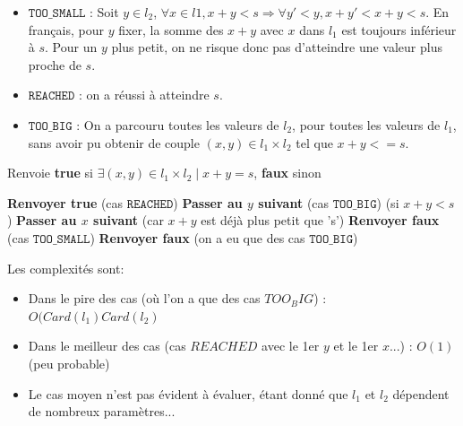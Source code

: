 \documentclass[10pt]{article}
\begin{document}
				\begin{itemize}[label=-]
					\setlength\itemsep{0.1em}
					\item $\mathtt{TOO\_SMALL}$ : Soit $y \in l_2$, $\forall x \in l1, x + y < s \Rightarrow \forall y' < y, x + y' < x + y < s$.
					En français, pour $y$ fixer, la somme des $x + y$ avec $x$ dans $l_1$ est toujours inférieur à $s$.
					Pour un $y$ plus petit, on ne risque donc pas d'atteindre une valeur plus proche de $s$.
					\item $\mathtt{REACHED}$ : on a réussi à atteindre $s$.
					\item $\mathtt{TOO\_BIG}$ : On a parcouru toutes les valeurs de $l_2$, pour toutes les valeurs de $l_1$,
					sans avoir pu obtenir de couple $(x, y) \in l_1 \times l_2$ tel que $x + y <= s$.
				\end{itemize}
				
				\begin{algorithm}
					\caption{Renvoie \textbf{true} si $\exists (x, y) \in l_1 \times l_2 \mid x + y = s$, \textbf{faux} sinon}
					\begin{algorithmic}[1]
										\State \textbf{Renvoyer true} (cas $\mathtt{REACHED}$)
										\State \textbf{Passer au $y$ suivant} (cas $\mathtt{TOO\_BIG}$)
									\Else (si $x + y < s$)
										\State \textbf{Passer au $x$ suivant} (car $x + y$ est déjà plus petit que 's')
									\EndIf
								\EndFor
								\State \textbf{Renvoyer faux} (cas $\mathtt{TOO\_SMALL}$)
							\EndFor
							\State \textbf{Renvoyer faux} (on a eu que des cas $\mathtt{TOO\_BIG}$)
						\EndFunction
					\end{algorithmic}
				\end{algorithm}
				
				Les complexités sont:
				\begin{itemize}[label=-]
					\setlength\itemsep{0.1em}
					\item Dans le pire des cas (où l'on a que des cas $TOO_BIG$) : $O(Card(l_1)Card(l_2)$
					\item Dans le meilleur des cas (cas $REACHED$ avec le 1er $y$ et le 1er $x$...) : $O(1)$ (peu probable)
					\item Le cas moyen n'est pas évident à évaluer, étant donné que $l_1$ et $l_2$ dépendent de nombreux paramètres...
				\end{itemize}
\end{document}

